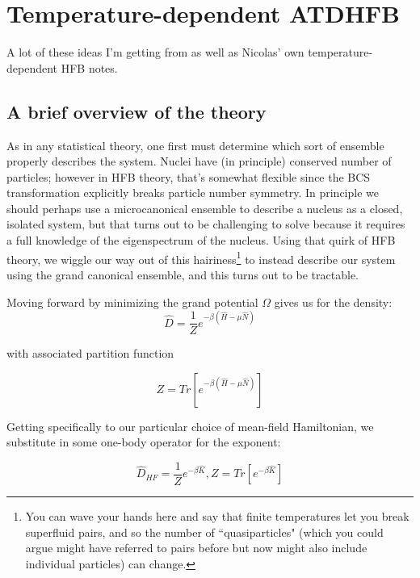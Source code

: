 \chapter{Temperature-dependent ATDHFB}

A lot of these ideas I'm getting from \cite{Schunck2015FTfission} as well as Nicolas' own temperature-dependent HFB notes.

\section{A brief overview of the theory}

As in any statistical theory, one first must determine which sort of ensemble properly describes the system. Nuclei have (in principle) conserved number of particles; however in HFB theory, that's somewhat flexible since the BCS transformation explicitly breaks particle number symmetry. In principle we should perhaps use a microcanonical ensemble to describe a nucleus as a closed, isolated system, but that turns out to be challenging to solve because it requires a full knowledge of the eigenspectrum of the nucleus. Using that quirk of HFB theory, we wiggle our way out of this hairiness\footnote{You can wave your hands here and say that finite temperatures let you break superfluid pairs, and so the number of ``quasiparticles" (which you could argue might have referred to pairs before but now might also include individual particles) can change.} to instead describe our system using the grand canonical ensemble, and this turns out to be tractable.

Moving forward by minimizing the grand potential $\Omega$ gives us for the density:
\begin{equation*}
\hat{D} = \frac{1}{Z}e^{-\beta\left(\hat{H}-\mu\hat{N}\right)}
\end{equation*}

\noindent with associated partition function

\begin{equation*}
Z = Tr\left[e^{-\beta\left(\hat{H}-\mu\hat{N}\right)}\right]
\end{equation*}

Getting specifically to our particular choice of mean-field Hamiltonian, we substitute in some one-body operator for the exponent:

\begin{equation*}
\hat{D}_{HF} = \frac{1}{Z}e^{-\beta\hat{K}}, Z = Tr\left[e^{-\beta\hat{K}}\right]
\end{equation*}

